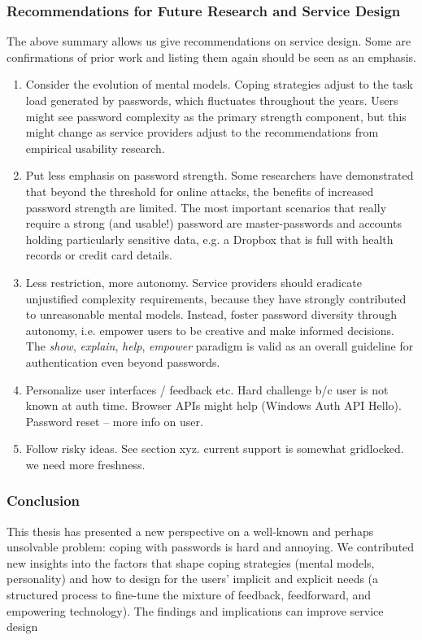 \subsubsection{Recommendations for Future Research and Service Design}
The above summary allows us give recommendations on service design. Some are confirmations of prior work and listing them again should be seen as an emphasis. 
\begin{enumerate}
	\item Consider the evolution of mental models. Coping strategies adjust to the task load generated by passwords, which fluctuates throughout the years. Users might see password complexity as the primary strength component, but this might change as service providers adjust to the recommendations from empirical usability research. 
	\item Put less emphasis on password strength. Some researchers have demonstrated that beyond the threshold for online attacks, the benefits of increased password strength are limited. The most important scenarios that really require a strong (and usable!) password are master-passwords and accounts holding particularly sensitive data, e.g. a Dropbox that is full with health records or credit card details. 
	\item Less restriction, more autonomy. Service providers should eradicate unjustified complexity requirements, because they have strongly contributed to unreasonable mental models. Instead, foster password diversity through autonomy, i.e. empower users to be creative and make informed decisions. The \textit{show}, \textit{explain}, \textit{help}, \textit{empower} paradigm is valid as an overall guideline for authentication even beyond passwords. 
	\item Personalize user interfaces / feedback etc. Hard challenge b/c user is not known at auth time. Browser APIs might help (Windows Auth API Hello). Password reset -- more info on user. 
	\item Follow risky ideas. See section xyz. current support is somewhat gridlocked. we need more freshness.  
\end{enumerate}

\subsubsection{Conclusion}
This thesis has presented a new perspective on a well-known and perhaps unsolvable problem: coping with passwords is hard and annoying. We contributed new insights into the factors that shape coping strategies (mental models, personality) and how to design for the users' implicit and explicit needs (a structured process to fine-tune the mixture of feedback, feedforward, and empowering technology). The findings and implications can improve service design 

